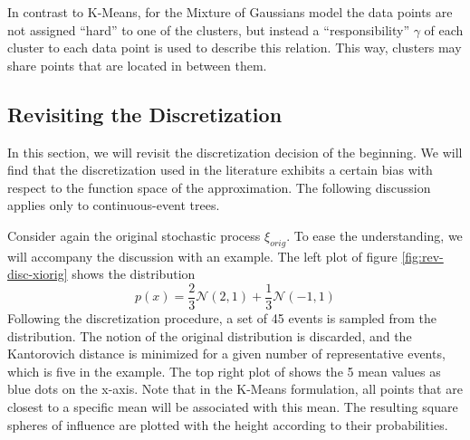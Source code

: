In contrast to K-Means, for the Mixture of Gaussians model the data points are not assigned ``hard'' to one of the clusters, but instead a ``responsibility'' $\gamma$ of each cluster to each data point is used to describe this relation. This way, clusters may share points that are located in between them.
\subsection{Revisiting the Discretization}
\label{sec:revisiting-discretization}
In this section, we will revisit the discretization decision of the beginning.
We will find that the discretization used in the literature exhibits a certain bias with respect to the function space of the approximation. The following discussion applies only to continuous-event trees.

Consider again the original stochastic process $\xi_{orig}$. To ease the understanding, we will accompany the discussion with an example. The left plot of figure \ref{fig:rev-disc-xiorig} shows the distribution
\begin{equation}
  \label{eq:24}
  p(x) = \frac{2}{3}\mathcal{N}(2,1) + \frac{1}{3}\mathcal{N}(-1,1)
\end{equation}
 Following the discretization procedure, a set of 45 events is sampled from the distribution.
 The notion of the original distribution is discarded, and the Kantorovich distance is minimized for a given number of representative events, which is five in the example.
 The top right plot of shows the 5 mean values as blue dots on the x-axis.
 Note that in the K-Means formulation, all points that are closest to a specific mean will be associated with this mean.
 The resulting square spheres of influence are plotted with the height according to their probabilities.

